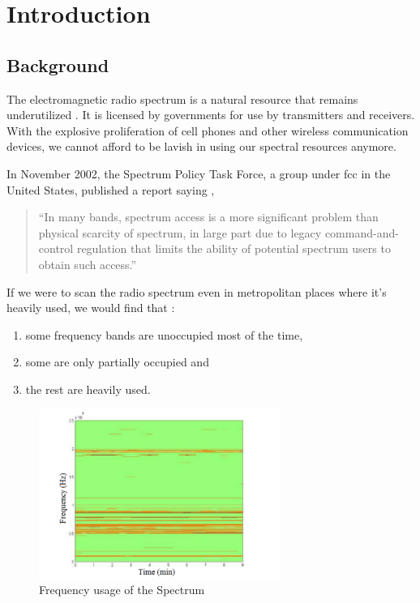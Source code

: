 \chapter{Introduction}
\thispagestyle{empty}
\section{Background}
The electromagnetic radio spectrum is a natural resource that remains 
underutilized \cite{haykin05}.
It is licensed by governments for use by transmitters and receivers.
With the explosive proliferation of cell phones and other wireless 
communication devices,
we cannot afford to be lavish in using our spectral resources anymore.

In November 2002, the Spectrum Policy Task Force, a group under \gls{fcc}
 in the United States, published a report saying
\cite{repFCC}, 
\begin{quote}
``In many bands, spectrum access is a more significant problem than physical 
scarcity of spectrum, in large part due to legacy command-and-control 
regulation that limits the ability of potential spectrum users to obtain such 
access.''
\end{quote}

If we were to scan the radio spectrum even in metropolitan places where it's
heavily used, 
we would find that \cite{staple04}:
\begin{enumerate}
	\item some frequency bands are unoccupied most of the time,
	\item some are only partially occupied and
	\item the rest are heavily used.
\end{enumerate}

\begin{figure}
\centering
\includegraphics[width=0.7\textwidth]{../images/freqUsage}
\caption[Frequency usage of the Spectrum]{Frequency
usage of the Spectrum {\cite{kranthi13}}}
\label{freqUsage}
\end{figure}

